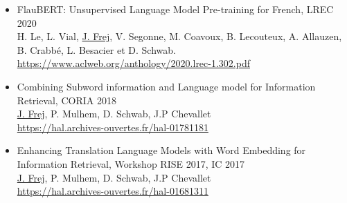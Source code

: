 \begin{itemize}
        \item FlauBERT: Unsupervised Language Model Pre-training for French, \textcolor{maincol}{LREC 2020}\\H. Le, L. Vial, \underline{J. Frej}, V. Segonne, M. Coavoux, B. Lecouteux, A. Allauzen, B. Crabbé, L. Besacier et D. Schwab.\\ \url{https://www.aclweb.org/anthology/2020.lrec-1.302.pdf}
        \item Combining Subword information and Language model for Information Retrieval, \textcolor{maincol}{CORIA 2018}\\\underline{J. Frej}, P. Mulhem, D. Schwab, J.P Chevallet\\ \url{https://hal.archives-ouvertes.fr/hal-01781181}
        \item Enhancing Translation Language Models with Word Embedding for Information Retrieval, \textcolor{maincol}{Workshop RISE 2017, IC 2017}\\\underline{J. Frej}, P. Mulhem, D. Schwab, J.P Chevallet \\ \url{https://hal.archives-ouvertes.fr/hal-01681311}
    \end{itemize}
    
    